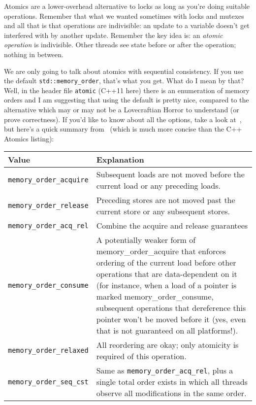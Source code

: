 Atomics are a lower-overhead alternative to
locks as long as you're doing suitable operations. Remember that what we wanted sometimes with locks and mutexes and all that is that operations are indivisible: an update to a variable doesn't get interfered with by another update. Remember the key idea is: an \textit{atomic operation} is indivisible. Other threads see state before or after the operation; nothing in between.


We are only going to talk about atomics with sequential consistency. If you use the default {\tt std::memory\_order}, that's what you get. What do I mean by that? Well, in the header file \texttt{atomic} (C++11 here) there is an enumeration of memory orders and I am suggesting that using the default is pretty nice, compared to the alternative which may or may not be a Lovecraftian Horror to understand (or prove correctness). If you'd like to know about all the options, take a look at~\cite{cppatomics}, but here's a quick summary from~\cite{bmref1} (which is much more concise than the C++ Atomics listing):

\begin{center}
	\begin{tabular}{l|p{12cm}}
	\textbf{Value} & \textbf{Explanation} \\ \hline
		\texttt{memory\_order\_acquire} &  Subsequent loads are not moved before the current load or any preceding loads.\\ \hline
		\texttt{memory\_order\_release} &  Preceding stores are not moved past the current store or any subsequent stores. \\ \hline
		\texttt{memory\_order\_acq\_rel} & Combine the acquire and release guarantees\\ \hline
		\texttt{memory\_order\_consume} & A potentially weaker form of memory\_order\_acquire that enforces ordering of the current load before other operations that are data-dependent on it (for instance, when a load of a pointer is marked memory\_order\_consume, subsequent operations that dereference this pointer won't be moved before it (yes, even that is not guaranteed on all platforms!).\\ \hline
	
	\texttt{memory\_order\_relaxed} & All reordering are okay; only atomicity is required of this operation. \\ \hline
\texttt{memory\_order\_seq\_cst} & Same as \texttt{memory\_order\_acq\_rel}, plus a single total order exists in which all threads observe all modifications in the same order.\\ 
	\end{tabular}

\end{center}



